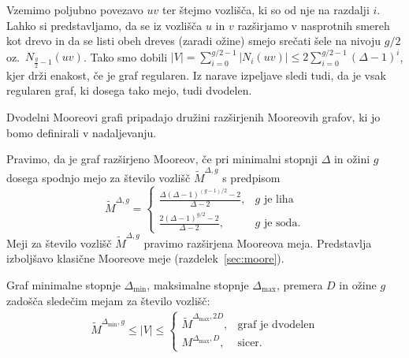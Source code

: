 \documentclass[fin1, tisk]{fmfdelo}
\begin{document}
\begin{dokaz}
    Vzemimo poljubno povezavo $uv$ ter štejmo vozlišča, ki so od nje na razdalji $i$.
    Lahko si predstavljamo, da se iz vozlišča $u$ in $v$ razširjamo v nasprotnih smereh kot drevo
    in da se listi obeh dreves (zaradi ožine) smejo srečati šele na nivoju $g/2$ oz.~$N_{\frac{g}{2}-1}(uv)$. Tako smo
    dobili $|V| = \sum_{i=0}^{g/2-1} |N_i(uv)| \leq 2\sum_{i=0}^{g/2-1} (\Delta - 1)^i$,
    kjer drži enakost, če je graf regularen. Iz narave izpeljave sledi tudi, da je vsak regularen
    graf, ki dosega tako mejo, tudi dvodelen.
\end{dokaz}

\begin{opomba}
    Dvodelni Mooreovi grafi pripadajo družini razširjenih Mooreovih grafov, ki jo bomo definirali v nadaljevanju.
\end{opomba}

\begin{definicija}
    Pravimo, da je graf razširjeno Mooreov, če pri minimalni stopnji $\Delta$ in ožini $g$ dosega spodnjo
    mejo za število vozlišč $\widetilde{M}^{\Delta, g}$ s predpisom
    \begin{equation}
        \widetilde{M}^{\Delta, g} = \begin{cases}
        \frac{\Delta(\Delta - 1)^{(g-1)/2} - 2}{\Delta - 2}, & g \text{ je liha} \\
        \frac{2(\Delta - 1)^{g/2} - 2}{\Delta - 2}, & g \text{ je soda}.
        \end{cases}
    \end{equation}
    Meji za število vozlišč $\widetilde{M}^{\Delta, g}$ pravimo razširjena Mooreova meja. 
    Predstavlja izboljšavo klasične Mooreove meje (razdelek~\ref{sec:moore}).
\end{definicija}

\begin{trditev}
    Graf minimalne stopnje $\Delta_{\min}$, maksimalne stopnje $\Delta_{\max}$,
    premera $D$ in ožine $g$ zadošča sledečim mejam za število vozlišč:
    \begin{align}
        \widetilde{M}^{\Delta_{\min}, g} \leq |V| \leq \begin{cases}
            \widetilde{M}^{\Delta_{\max}, 2D}, & \text{graf je dvodelen} \\
            M^{\Delta_{\max}, D}, & \text{sicer}.
        \end{cases}
    \end{align}
\end{trditev}
\end{document}
